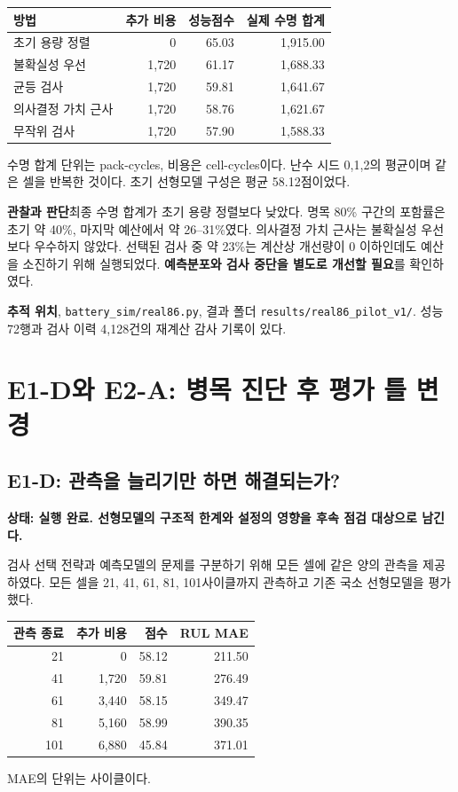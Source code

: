 \documentclass[11pt,a4paper]{article}
\newcommand{\file}[1]{{\small\nolinkurl{#1}}}
\newcommand{\state}[1]{\textbf{상태: #1}}
\begin{document}
\begin{center}
\begin{tabular}{lrrr}
\toprule
방법 & 추가 비용 & 성능점수 & 실제 수명 합계 \\
\midrule
초기 용량 정렬 & 0 & 65.03 & 1,915.00 \\
불확실성 우선 & 1,720 & 61.17 & 1,688.33 \\
균등 검사 & 1,720 & 59.81 & 1,641.67 \\
의사결정 가치 근사 & 1,720 & 58.76 & 1,621.67 \\
무작위 검사 & 1,720 & 57.90 & 1,588.33 \\
\bottomrule
\end{tabular}
\end{center}
수명 합계 단위는 pack-cycles, 비용은 cell-cycles이다. 난수 시드 0,1,2의 평균이며 같은 셀을 반복한 것이다. 초기 선형모델 구성은 평균 58.12점이었다.

\textbf{관찰과 판단}\quad 최종 수명 합계가 초기 용량 정렬보다 낮았다. 명목 80\% 구간의 포함률은 초기 약 40\%, 마지막 예산에서 약 26--31\%였다. 의사결정 가치 근사는 불확실성 우선보다 우수하지 않았다. 선택된 검사 중 약 23\%는 계산상 개선량이 0 이하인데도 예산을 소진하기 위해 실행되었다. \textbf{예측분포와 검사 중단을 별도로 개선할 필요}를 확인하였다.

\textbf{추적 위치}\quad \file{configs/real86.json}, \file{battery_sim/real86.py}, 결과 폴더 \file{results/real86_pilot_v1/}. 성능 72행과 검사 이력 4,128건의 재계산 감사 기록이 있다.

\clearpage
\section{E1-D와 E2-A: 병목 진단 후 평가 틀 변경}
\subsection*{E1-D: 관측을 늘리기만 하면 해결되는가?}
\state{실행 완료. 선형모델의 구조적 한계와 설정의 영향을 후속 점검 대상으로 남긴다.}

검사 선택 전략과 예측모델의 문제를 구분하기 위해 모든 셀에 같은 양의 관측을 제공하였다. 모든 셀을 21, 41, 61, 81, 101사이클까지 관측하고 기존 국소 선형모델을 평가했다.
\begin{center}
\begin{tabular}{rrrr}
\toprule
관측 종료 & 추가 비용 & 점수 & RUL MAE \\
\midrule
21  & 0 & 58.12 & 211.50 \\
41  & 1,720 & 59.81 & 276.49 \\
61  & 3,440 & 58.15 & 349.47 \\
81  & 5,160 & 58.99 & 390.35 \\
101 & 6,880 & 45.84 & 371.01 \\
\bottomrule
\end{tabular}
\end{center}
MAE의 단위는 사이클이다.
\end{document}
